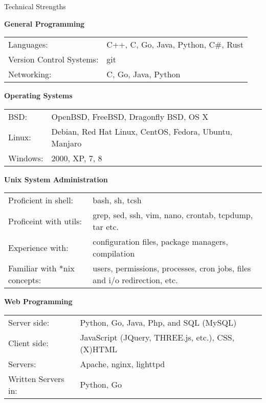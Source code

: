 \documentclass{resume} %
\newcommand{\btab}[2]{
	\bgroup
	\def\arraystretch{#1}
	\begin{tabular}{#2}
}
\newcommand{\etab}{
	\end{tabular} \smallskip
	\egroup
}
\begin{document}
\begin{rSection}{Technical Strengths}

{\bf General Programming}

\btab{1.1}{ l l }
	Languages: & C++, C, Go, Java, Python, C\#, Rust \\
	Version Control Systems: & git \\
	Networking: & C, Go, Java, Python \\
\etab

{\bf Operating Systems}

\btab{1.1}{ l l }
	BSD: & OpenBSD, FreeBSD, Dragonfly BSD, OS X \\
	Linux: & Debian, Red Hat Linux, CentOS, Fedora, Ubuntu, Manjaro \\
	Windows: & 2000, XP, 7, 8
\etab

{\bf Unix System Administration}

\btab{1.1}{ l l }
	Proficient in shell: & bash, sh, tcsh \\
	Proficeint with utils: & grep, sed, ssh, vim, nano, crontab, tcpdump, tar etc. \\
	Experience with: & configuration files, package managers, compilation \\
	Familiar with *nix concepts: & users, permissions, processes, cron jobs, files and i/o redirection, etc.
\etab

{\bf Web Programming}

\btab{1.1}{ l l }
	Server side: & Python, Go, Java, Php, and SQL (MySQL) \\
	Client side: & JavaScript (JQuery, THREE.js, etc.), CSS, (X)HTML \\
	Servers: & Apache, nginx, lighttpd \\
	Written Servers in: & Python, Go \\
\etab

\end{rSection}
\end{document}
